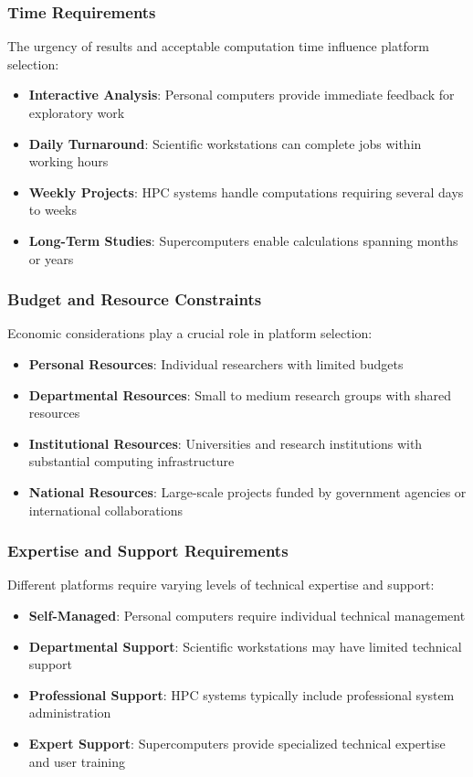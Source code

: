 \subsubsection{Time Requirements}

The urgency of results and acceptable computation time influence platform selection:

\begin{itemize}
    \item \textbf{Interactive Analysis}: Personal computers provide immediate feedback for exploratory work
    \item \textbf{Daily Turnaround}: Scientific workstations can complete jobs within working hours
    \item \textbf{Weekly Projects}: HPC systems handle computations requiring several days to weeks
    \item \textbf{Long-Term Studies}: Supercomputers enable calculations spanning months or years
\end{itemize}

\subsubsection{Budget and Resource Constraints}

Economic considerations play a crucial role in platform selection:

\begin{itemize}
    \item \textbf{Personal Resources}: Individual researchers with limited budgets
    \item \textbf{Departmental Resources}: Small to medium research groups with shared resources
    \item \textbf{Institutional Resources}: Universities and research institutions with substantial computing infrastructure
    \item \textbf{National Resources}: Large-scale projects funded by government agencies or international collaborations
\end{itemize}

\subsubsection{Expertise and Support Requirements}

Different platforms require varying levels of technical expertise and support:

\begin{itemize}
    \item \textbf{Self-Managed}: Personal computers require individual technical management
    \item \textbf{Departmental Support}: Scientific workstations may have limited technical support
    \item \textbf{Professional Support}: HPC systems typically include professional system administration
    \item \textbf{Expert Support}: Supercomputers provide specialized technical expertise and user training
\end{itemize}

